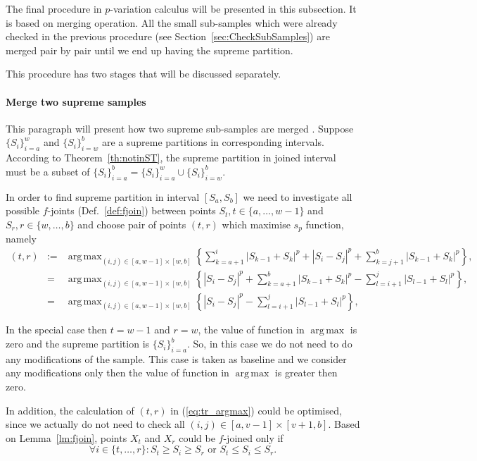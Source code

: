 \documentclass[12pt, a4paper]{article}
\DeclareMathOperator*{\argmax}{arg\,max}
\numberwithin{equation}{section}
\begin{document}
The final procedure in $p$-variation calculus will be
presented in this subsection. It is based on
merging operation. 
All the small sub-samples which were 
already checked in the 
previous procedure 
(see Section~\ref{sec:CheckSubSamples}) 
are merged pair by pair until  we end up having
the supreme partition.

This procedure has two stages that will be discussed separately.

\paragraph{Merge two supreme samples}

This paragraph will present how two supreme
sub-samples are merged .
Suppose $\{S_{i}\}_{i=a}^{w}$  and $\{S_{i}\}_{i=w}^{b}$
are a supreme partitions in corresponding intervals. 
According to Theorem~\ref{th:notinST},
the supreme partition in joined interval
must be a subset of 
$\{S_{i}\}_{i=a}^{b} = \{S_{i}\}_{i=a}^{w} \cup \{S_{i}\}_{i=w}^{b}$.
 
In order to find supreme partition in interval $[S_a,S_b]$
we need to investigate all possible
$f$-joints (Def.~\ref{def:fjoin}) between points $S_t, t\in \{a,\dots,w-1\}$ and
$S_r, r\in \{w,\dots,b\}$ and choose pair of points
$(t, r)$ which maximise $s_p$ function, namely  
\begin{eqnarray}
  (t, r) &:=& \argmax_{(i,j) \in [a, w-1] \times [w, b] } 
    \left\{ \sum_{k=a+1}^i |S_{k-1} + S_{k}|^p + |S_i-S_j|^p 
    + \sum_{k=j+1}^b |S_{k-1} + S_{k}|^p \right\}, \nonumber \\
  &=& \argmax_{(i,j) \in [a, w-1] \times [w, b] }  
    \left\{|S_i-S_j|^p +  \sum_{k=a+1}^b |S_{k-1} + S_{k}|^p  
    - \sum_{l=i+1}^j |S_{l-1} + S_{l}|^p  \right\}, \nonumber \\
   \label{eq:tr_argmax}  
   &=& \argmax_{(i,j) \in [a, w-1] \times [w, b] }  
    \left\{|S_i-S_j|^p - \sum_{l=i+1}^j |S_{l-1} + S_{l}|^p  \right\},   
\end{eqnarray}

In the special case then $t=w-1$ and $r=w$, the value 
of function in $\argmax$ is zero and the supreme
partition is $\{S_{i}\}_{i=a}^{b}$. 
So, in this case we do not 
need to do any modifications of the sample. 
This case is taken as baseline and we consider 
any modifications only then the value of function
in $\argmax$ is greater then zero.

In addition, the calculation of $(t, r)$ in (\ref{eq:tr_argmax})
could be optimised, since we actually do not need to check
all $(i,j) \in [a, v-1] \times [v+1, b]$. 
Based on Lemma~\ref{lm:fjoin},
points $X_t$ and $X_r$ could be $f$-joined only if 
\begin{equation}
  \forall i \in \{t,\dots,r\}: S_t \geq S_i \geq S_r \text{ or } 
  S_t \leq S_i \leq S_r.
\end{equation} 
   
\end{document}
